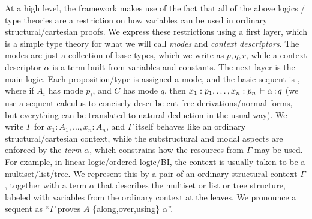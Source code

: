 At a high level, the framework makes use of the fact that all of the
above logics / type theories are a restriction on how variables can be
used in ordinary structural/cartesian proofs.  We express these
restrictions using a first layer, which is a simple type theory for what
we will call \emph{modes} and \emph{context descriptors}.  The modes are
just a collection of base types, which we write as $p,q,r$, while a
context descriptor $\alpha$ is a term built from variables and
constants.  The next layer is the main logic.  Each proposition/type is
assigned a mode, and the basic sequent is , where if $A_i$ has mode $p_i$, and $C$ has mode $q$,
then $x_1 : p_1,\ldots, x_n : p_n \, \vdash \alpha \, \mathit{:} \, q$ (we use a sequent
calculus to concisely describe cut-free derivations/normal forms, but
everything can be translated to natural deduction in the usual way).  We
write ${\Gamma}$ for $x_1 : A_1, \ldots, x_n : A_n$, and $\Gamma$ itself
behaves like an ordinary structural/cartesian context, while the
substructural and modal aspects are enforced by the \emph{term}
$\alpha$, which constrains how the resources from $\Gamma$ may be used.
For example, in linear logic/ordered logic/BI, the context is usually
taken to be a multiset/list/tree.  We represent this by a pair of an
ordinary structural context $\Gamma$, together with a term $\alpha$ that
describes the multiset or list or tree structure, labeled with variables
from the ordinary context at the leaves.  We pronounce a sequent
 as ``$\Gamma$ proves $A$ \{along,over,using\}
$\alpha$''.

